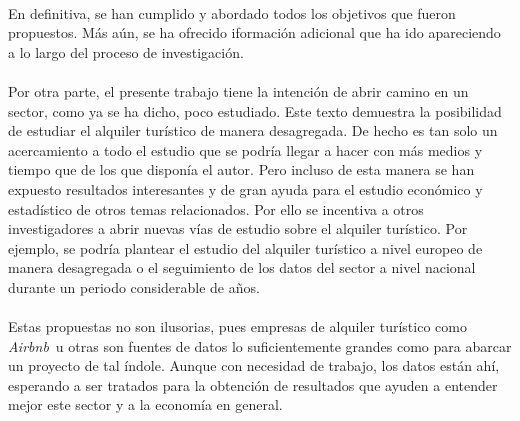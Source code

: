 \documentclass[a4paper,10pt]{article}
\newcommand*{\airbnb}{\textit{Airbnb}}
\begin{document}
\begin{multicols}{2}
        \paragraph*{}
        En definitiva, se han cumplido y abordado todos los objetivos que fueron propuestos. Más aún, se ha ofrecido iformación adicional que ha 
        ido apareciendo a lo largo del proceso de investigación. 
     
        \paragraph*{}
        Por otra parte, el presente trabajo tiene la intención de abrir camino en un sector,
        como ya se ha dicho, poco estudiado. Este texto demuestra la posibilidad de estudiar el alquiler turístico de manera desagregada. De hecho es
        tan solo un acercamiento a todo el estudio que se podría llegar a hacer con más medios y tiempo que de los que disponía el autor. Pero incluso 
        de esta manera se han expuesto resultados interesantes y de gran ayuda para el estudio económico y estadístico de otros temas relacionados.
        Por ello se incentiva a otros investigadores a abrir nuevas vías de estudio sobre el alquiler turístico. Por ejemplo, se podría 
        plantear el estudio del alquiler turístico a nivel europeo de manera desagregada o el seguimiento de los datos del sector a nivel nacional durante 
        un periodo considerable de años. 

        \paragraph*{}
        Estas propuestas no son ilusorias, pues empresas de alquiler turístico como \airbnb \ u otras son fuentes de datos lo suficientemente grandes
        como para abarcar un proyecto de tal índole. Aunque con necesidad de trabajo, los datos están ahí, esperando a ser tratados para la obtención de 
        resultados que ayuden a entender mejor este sector y a la economía en general.

    \end{multicols}
    \setlength{\columnsep}{10pt}

    \clearpage
\end{document}
